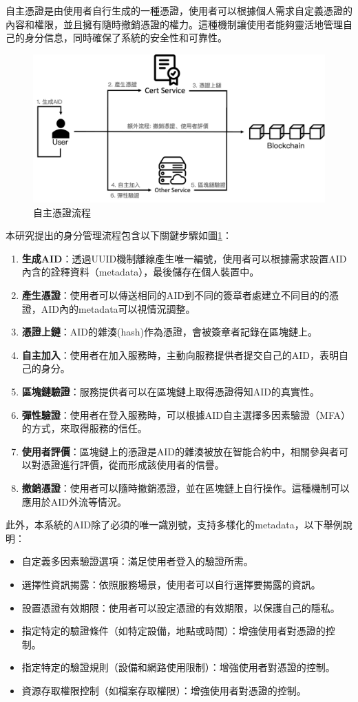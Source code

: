 自主憑證是由使用者自行生成的一種憑證，使用者可以根據個人需求自定義憑證的內容和權限，並且擁有隨時撤銷憑證的權力。這種機制讓使用者能夠靈活地管理自己的身分信息，同時確保了系統的安全性和可靠性。
\begin{figure}
  \centering
  \includegraphics[width=\linewidth,keepaspectratio]{figures/flow-sc.png}
  \caption{自主憑證流程}
  \label{fig:flow-sc}
\end{figure}
本研究提出的身分管理流程包含以下關鍵步驟如圖\ref{fig:flow-sc}：
\begin{enumerate}
  \item \textbf{生成AID}：透過UUID\cite{uuid}機制離線產生唯一編號，使用者可以根據需求設置AID內含的詮釋資料（metadata），最後儲存在個人裝置中。
  \item \textbf{產生憑證}：使用者可以傳送相同的AID到不同的簽章者處建立不同目的的憑證，AID內的metadata可以視情況調整。
  \item \textbf{憑證上鏈}：AID的雜湊(hash)作為憑證，會被簽章者記錄在區塊鏈上。
  \item \textbf{自主加入}：使用者在加入服務時，主動向服務提供者提交自己的AID，表明自己的身分。
  \item \textbf{區塊鏈驗證}：服務提供者可以在區塊鏈上取得憑證得知AID的真實性。
  \item \textbf{彈性驗證}：使用者在登入服務時，可以根據AID自主選擇多因素驗證（MFA）的方式，來取得服務的信任。
  \item \textbf{使用者評價}：區塊鏈上的憑證是AID的雜湊被放在智能合約中，相關參與者可以對憑證進行評價，從而形成該使用者的信譽。
  \item \textbf{撤銷憑證}：使用者可以隨時撤銷憑證，並在區塊鏈上自行操作。這種機制可以應用於AID外流等情況。
\end{enumerate}
此外，本系統的AID除了必須的唯一識別號，支持多樣化的metadata，以下舉例說明：
\begin{itemize}
  \item 自定義多因素驗證選項：滿足使用者登入的驗證所需。
  \item 選擇性資訊揭露：依照服務場景，使用者可以自行選擇要揭露的資訊。
  \item 設置憑證有效期限：使用者可以設定憑證的有效期限，以保護自己的隱私。
  \item 指定特定的驗證條件（如特定設備，地點或時間）：增強使用者對憑證的控制。
  \item 指定特定的驗證規則（設備和網路使用限制）：增強使用者對憑證的控制。
  \item 資源存取權限控制（如檔案存取權限）：增強使用者對憑證的控制。
\end{itemize}

